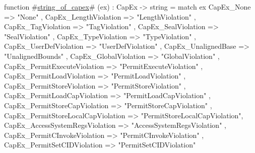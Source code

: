 function #\hyperref[sailRISCVzstringzyofzycapex]{string\_of\_capex}# (ex) : CapEx -> string =
  match ex {
    CapEx_None                          => "None"                        ,
    CapEx_LengthViolation               => "LengthViolation"             ,
    CapEx_TagViolation                  => "TagViolation"                ,
    CapEx_SealViolation                 => "SealViolation"               ,
    CapEx_TypeViolation                 => "TypeViolation"               ,
    CapEx_UserDefViolation              => "UserDefViolation"            ,
    CapEx_UnalignedBase                 => "UnalignedBounds"             ,
    CapEx_GlobalViolation               => "GlobalViolation"             ,
    CapEx_PermitExecuteViolation        => "PermitExecuteViolation"      ,
    CapEx_PermitLoadViolation           => "PermitLoadViolation"         ,
    CapEx_PermitStoreViolation          => "PermitStoreViolation"        ,
    CapEx_PermitLoadCapViolation        => "PermitLoadCapViolation"      ,
    CapEx_PermitStoreCapViolation       => "PermitStoreCapViolation"     ,
    CapEx_PermitStoreLocalCapViolation  => "PermitStoreLocalCapViolation",
    CapEx_AccessSystemRegsViolation     => "AccessSystemRegsViolation"   ,
    CapEx_PermitCInvokeViolation        => "PermitCInvokeViolation"      ,
    CapEx_PermitSetCIDViolation         => "PermitSetCIDViolation"
  }
